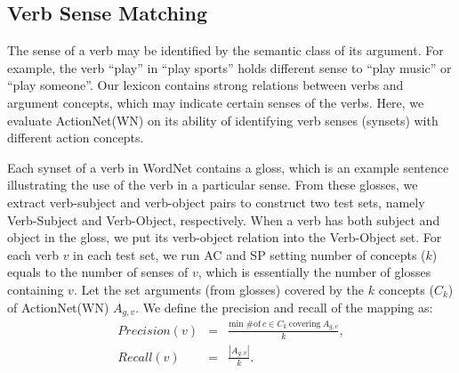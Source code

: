 \subsection{Verb Sense Matching}
\label{sec:synset}
The sense of a verb may be identified by the semantic class of its argument.
For example, the verb ``play'' in ``play sports'' holds different
sense to ``play music'' or ``play someone''.
Our lexicon contains strong relations between
verbs and argument concepts, which may indicate certain senses of
the verbs. Here, we evaluate ActionNet(WN) on its ability 
of identifying verb senses (synsets) with different 
action concepts.

Each synset of a verb in WordNet contains a gloss, which is an example
sentence illustrating the use of the verb in a particular sense.
From these glosses, we extract verb-subject and verb-object pairs
to construct two test sets, namely Verb-Subject and Verb-Object, respectively.
When a verb has both subject and object in the gloss,
we put its verb-object relation into the Verb-Object set.
For each verb $v$ in each test set, we run AC and SP setting number of concepts ($k$) equals to the
number of senses of $v$,
which is essentially the number of glosses containing $v$.
Let the set arguments (from glosses) covered by the 
$k$ concepts ($C_k$)
of ActionNet(WN) $A_{g,v}$.
We define the precision
and recall of the mapping as:
\begin{eqnarray*}
Precision(v) &=& \frac{\mbox{min \# of}\ c\in C_k\ \mbox{covering}\ A_{g,v}}{k},\\
Recall(v) &=& \frac{|A_{g,v}|}{k}.\\
\end{eqnarray*}

